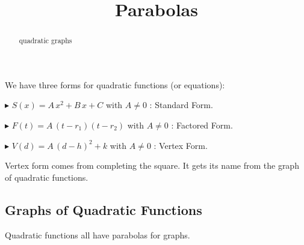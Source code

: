 \documentclass{ximera}
\title{Parabolas}
\begin{document}
\begin{abstract}
quadratic graphs
\end{abstract}
\maketitle





We have three forms for quadratic functions (or equations):



$\blacktriangleright$ $S(x) = A \, x^2 + B \, x + C$  with $A \ne 0$ : Standard Form. 


$\blacktriangleright$ $F(t) = A \, (t - r_1)(t - r_2)$  with $A \ne 0$ : Factored Form. 


$\blacktriangleright$ $V(d) = A \, (d - h)^2 + k$  with $A \ne 0$ : Vertex Form. 




Vertex form comes from completing the square.  It gets its name from the graph of quadratic functions.









\subsection*{Graphs of Quadratic Functions}



Quadratic functions all have parabolas for graphs.
\end{document}
